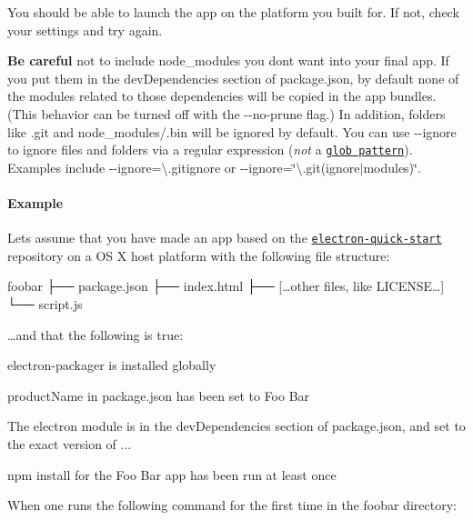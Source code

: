 You should be able to launch the app on the platform you built for. If not, check your settings and try again.

{\bfseries Be careful} not to include {\ttfamily node\+\_\+modules} you don\textquotesingle{}t want into your final app. If you put them in the {\ttfamily dev\+Dependencies} section of {\ttfamily package.\+json}, by default none of the modules related to those dependencies will be copied in the app bundles. (This behavior can be turned off with the {\ttfamily -\/-\/no-\/prune} flag.) In addition, folders like {\ttfamily .git} and {\ttfamily node\+\_\+modules/.bin} will be ignored by default. You can use {\ttfamily -\/-\/ignore} to ignore files and folders via a regular expression ({\itshape not} a \href{https://en.wikipedia.org/wiki/Glob_%28programming%29}{\tt glob pattern}). Examples include {\ttfamily -\/-\/ignore=\textbackslash{}.gitignore} or {\ttfamily -\/-\/ignore=\char`\"{}\textbackslash{}.\+git(ignore$\vert$modules)\char`\"{}}.

\paragraph*{Example}

Let\textquotesingle{}s assume that you have made an app based on the \href{https://github.com/electron/electron-quick-start}{\tt electron-\/quick-\/start} repository on a OS X host platform with the following file structure\+:


\begin{DoxyCode}
foobar
├── package.json
├── index.html
├── […other files, like LICENSE…]
└── script.js
\end{DoxyCode}


…and that the following is true\+:


\begin{DoxyItemize}
\item {\ttfamily electron-\/packager} is installed globally
\item {\ttfamily product\+Name} in {\ttfamily package.\+json} has been set to {\ttfamily Foo Bar}
\item The {\ttfamily electron} module is in the {\ttfamily dev\+Dependencies} section of {\ttfamily package.\+json}, and set to the exact version of {..}.
\item {\ttfamily npm install} for the {\ttfamily Foo Bar} app has been run at least once
\end{DoxyItemize}

When one runs the following command for the first time in the {\ttfamily foobar} directory\+:


